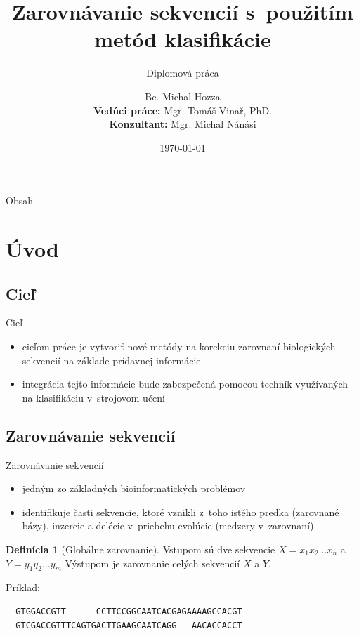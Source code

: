 \documentclass[xcolor=dvipsnames, compress, 12pt]{beamer}
\title{Zarovnávanie sekvencií s~použitím metód klasifikácie}
\subtitle{
\vspace{0.5cm}
\small Diplomová práca
}
\author[Michal Hozza]{\small Bc. Michal Hozza \\ \vspace{1cm} \footnotesize \textbf{Vedúci práce:} Mgr. Tomáš Vinař, PhD. \\ \textbf{Konzultant:} Mgr. Michal Nánási\\ \vspace{.5cm}}
\institute[FMFI UK \insertshortdate]{
  Fakulta matematiky, fyziky a informatiky,
  Univerzita Komenského, Bratislava\\
}
\date[\the\year]{\footnotesize \today}
\theoremstyle{definition}
\newtheorem{df}[vt]{Definícia}
\begin{document}
\begin{frame}[plain]
  \titlepage
\end{frame}


\begin{frame}{Obsah}
  \transdissolve[duration=0.1]
  \tableofcontents
\end{frame}


\section{Úvod}

\subsection{Cieľ}
\begin{frame}{Cieľ}
  \begin{itemize}
  \item cieľom práce je vytvoriť nové metódy na korekciu zarovnaní biologických sekvencií na základe prídavnej informácie
  \item integrácia tejto informácie bude zabezpečená pomocou techník využívaných na klasifikáciu v~strojovom učení
  \end{itemize}
\end{frame}

\subsection{Zarovnávanie sekvencií}
\begin{frame}[fragile]{Zarovnávanie sekvencií}
  \begin{itemize}
      \item jedným zo základných bioinformatických problémov
      \item identifikuje časti sekvencie, ktoré vznikli z~toho istého predka (zarovnané bázy), inzercie a delécie v~priebehu evolúcie (medzery v~zarovnaní)
  \end{itemize}
\pause
\begin{df}[Globálne zarovnanie]
Vstupom sú dve sekvencie $X = x_1x_2\dots x_n$ a $Y = y_1y_2\dots y_m$
Výstupom je zarovnanie celých sekvencií $X$ a $Y$.
\end{df}
\pause
Príklad:
      \begin{verbatim}
  GTGGACCGTT------CCTTCCGGCAATCACGAGAAAAGCCACGT
  GTCGACCGTTTCAGTGACTTGAAGCAATCAGG---AACACCACCT
      \end{verbatim}
\end{frame}
\end{document}
